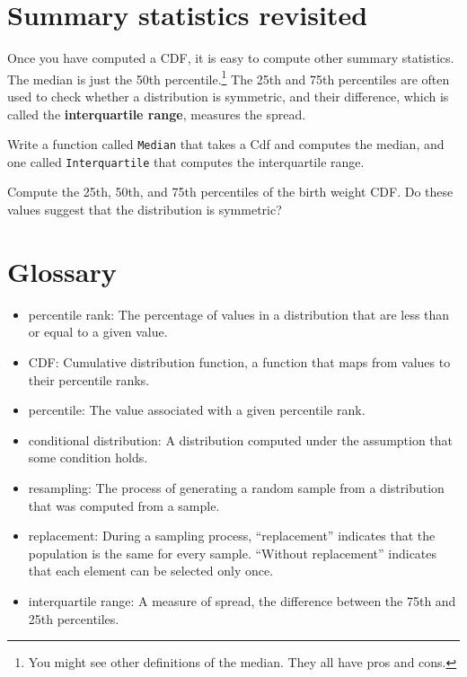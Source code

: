 \documentclass[12pt]{book}
\begin{document}
\section{Summary statistics revisited}

Once you have computed a CDF, it is easy to compute other summary
statistics.  The median is just the 50th percentile.\footnote{You might
see other definitions of the median.  They all have pros and cons.}
The 25th and 75th percentiles are often used to check whether
a distribution is symmetric, and their difference, which is called
the {\bf interquartile range}, measures the spread.

\begin{exercise}
Write a function called {\tt Median} that takes a Cdf and computes the
median, and one called {\tt Interquartile} that computes
the interquartile range.

Compute the 25th, 50th, and 75th percentiles of the birth weight
CDF.  Do these values suggest that the distribution is symmetric?

\end{exercise}


\section{Glossary}

\begin{itemize}

\item percentile rank: The percentage of values in a distribution that are
less than or equal to a given value.

\item CDF: Cumulative distribution function, a function that maps
  from values to their percentile ranks.

\item percentile: The value associated with a given percentile rank.

\item conditional distribution: A distribution computed under the assumption
that some condition holds.

\item resampling: The process of generating a random sample from a
distribution that was computed from a sample.

\item replacement: During a sampling process, ``replacement'' indicates
that the population is the same for every sample.  ``Without replacement''
indicates that each element can be selected only once.

\item interquartile range: A measure of spread, the difference between
the 75th and 25th percentiles.

\end{itemize}
\end{document}

